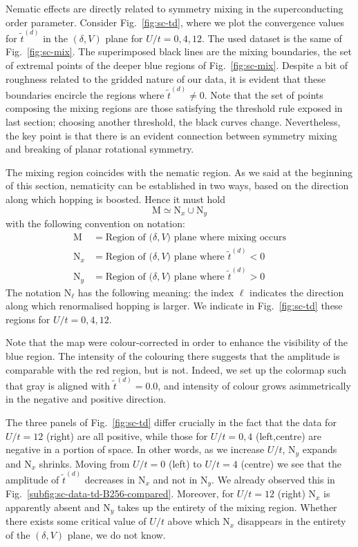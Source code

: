 Nematic effects are directly related to symmetry mixing in the superconducting order parameter. Consider Fig.~\ref{fig:sc-td}, where we plot the convergence values for $\tilde{t}^{(d)}$ in the $(\delta,V)$ plane for $U/t=0,4,12$. The used dataset is the same of Fig.~\ref{fig:sc-mix}. The superimposed black lines are the mixing boundaries, the set of extremal points of the deeper blue regions of Fig.~\ref{fig:sc-mix}. Despite a bit of roughness related to the gridded nature of our data, it is evident that these boundaries encircle the regions where $\tilde{t}^{(d)}\neq 0$. Note that the set of points composing the mixing regions are those satisfying the threshold rule exposed in last section; choosing another threshold, the black curves change. Nevertheless, the key point is that there is an evident connection between symmetry mixing and breaking of planar rotational symmetry.

The mixing region coincides with the nematic region. As we said at the beginning of this section, nematicity can be established in two ways, based on the direction along which hopping is boosted. Hence it must hold
\[
	\mathrm{M} \simeq \mathrm{N}_x \cup \mathrm{N}_y
\]
with the following convention on notation:
\[
\begin{aligned}
	\mathrm{M} &= \text{Region of ($\delta,V$) plane where mixing occurs} \\
	\mathrm{N}_x &= \text{Region of ($\delta,V$) plane where $\tilde{t}^{(d)} < 0$} \\
	\mathrm{N}_y &= \text{Region of ($\delta,V$) plane where $\tilde{t}^{(d)} > 0$}
\end{aligned}
\]
The notation $\mathrm{N}_\ell$ has the following meaning: the index $\ell$ indicates the direction along which renormalised hopping is larger. We indicate in Fig.~\ref{fig:sc-td} these regions for $U/t=0,4,12$.

Note that the map were colour-corrected in order to enhance the visibility of the blue region. The intensity of the colouring there suggests that the amplitude is comparable with the red region, but is not. Indeed, we set up the colormap such that gray is aligned with $\tilde{t}^{(d)}=0.0$, and intensity of colour grows asimmetrically in the negative and positive direction.

The three panels of Fig.~\ref{fig:sc-td} differ crucially in the fact that the data for $U/t=12$ (right) are all positive, while those for $U/t=0,4$ (left,centre) are negative in a portion of space. In other words, as we increase $U/t$, $\mathrm{N}_y$ expands and $\mathrm{N}_x$ shrinks. Moving from $U/t=0$ (left) to $U/t=4$ (centre) we see that the amplitude of $\tilde{t}^{(d)}$ decreases in $\mathrm{N}_x$ and not in $\mathrm{N}_y$. We already observed this in Fig.~\ref{subfig:sc-data-td-B256-compared}. Moreover, for $U/t=12$ (right) $\mathrm{N}_x$ is apparently absent and $\mathrm{N}_y$ takes up the entirety of the mixing region. Whether there exists some critical value of $U/t$ above which $\mathrm{N}_x$ disappears in the entirety of the $(\delta,V)$ plane, we do not know.

